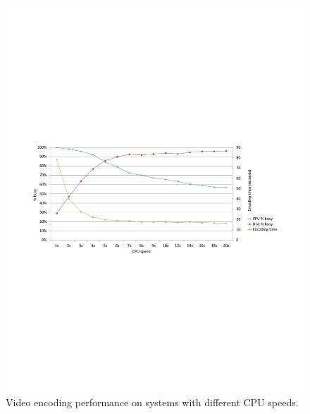 \begin{figure}[htpb]
	\centering
	\includegraphics[trim=2cm 10cm 2cm 10cm, width=\textwidth]{figures/ch5-encoding-time.pdf}
	\caption{\label{fig:ch5-encoding-time}Video encoding performance on systems with different CPU speeds.}
\end{figure}
